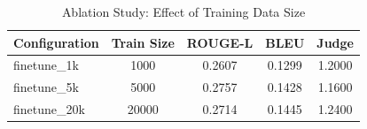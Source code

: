 \begin{table}[htbp]
\centering
\caption{Ablation Study: Effect of Training Data Size}
\label{tab:ablation}
\begin{tabular}{lcccc}
\toprule
Configuration & Train Size & ROUGE-L & BLEU & Judge \\
\midrule
finetune\_1k & 1000 & 0.2607 & 0.1299 & 1.2000 \\
finetune\_5k & 5000 & 0.2757 & 0.1428 & 1.1600 \\
finetune\_20k & 20000 & 0.2714 & 0.1445 & 1.2400 \\
\bottomrule
\end{tabular}
\end{table}